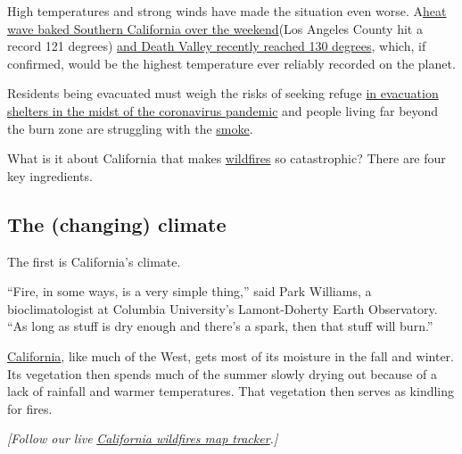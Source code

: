 High temperatures and strong winds have made the situation even worse.
A\href{https://www.nytimes3xbfgragh.onion/article/california-weather.html?smid=tw-nytimes\&smtyp=cur}{heat
wave baked Southern California over the weekend}(Los Angeles County hit
a record 121 degrees)
\href{https://www.nytimes3xbfgragh.onion/2020/08/17/climate/death-valley-hottest-temperature-on-earth.html}{and
Death Valley recently reached 130 degrees}, which, if confirmed, would
be the highest temperature ever reliably recorded on the planet.

Residents being evacuated must weigh the risks of seeking refuge
\href{https://www.nytimes3xbfgragh.onion/2020/08/20/us/ca-wildfires-covid.html}{in
evacuation shelters in the midst of the coronavirus pandemic} and people
living far beyond the burn zone are struggling with the
\href{https://twitter.com/NWSBayArea/status/1296355443158036481?ref_src=twsrc\%5Etfw\%7Ctwcamp\%5Etweetembed\%7Ctwterm\%5E1296355443158036481\%7Ctwgr\%5E\&ref_url=https\%3A\%2F\%2Fwww.nytimes3xbfgragh.onion\%2F2020\%2F08\%2F20\%2Fus\%2Fca-fires.html}{smoke}.

What is it about California that makes
\href{https://www.nytimes3xbfgragh.onion/2020/09/08/us/california-wildfires-helicopter-rescue.html}{wildfires}
so catastrophic? There are four key ingredients.

\hypertarget{the-changing-climate}{%
\subsection{The (changing) climate}\label{the-changing-climate}}

The first is California's climate.

``Fire, in some ways, is a very simple thing,'' said Park Williams, a
bioclimatologist at Columbia University's Lamont-Doherty Earth
Observatory. ``As long as stuff is dry enough and there's a spark, then
that stuff will burn.''

\href{https://www.nytimes3xbfgragh.onion/2019/10/30/us/getty-fire-california-kincade.html}{California},
like much of the West, gets most of its moisture in the fall and winter.
Its vegetation then spends much of the summer slowly drying out because
of a lack of rainfall and warmer temperatures. That vegetation then
serves as kindling for fires.

\emph{{[}Follow our live}
\href{https://www.nytimes3xbfgragh.onion/interactive/2020/08/20/us/california-wildfire-maps.html}{\emph{California
wildfires map tracker}}\emph{.{]}}

